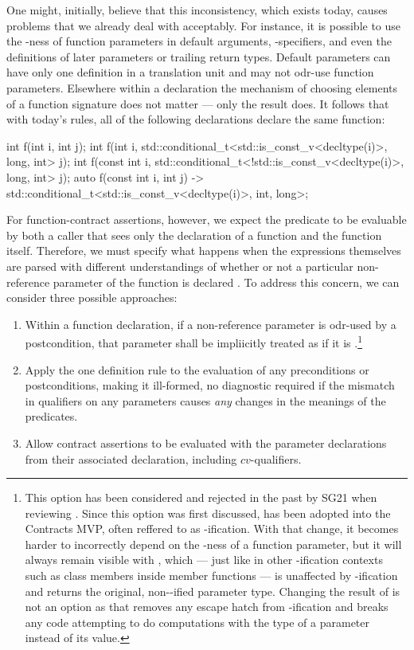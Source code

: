 One might, initially, believe that this inconsistency, which exists today, causes problems that we already deal with acceptably.  For instance, it is possible to use the -ness of function parameters in default arguments, -specifiers, and even the definitions of later parameters or trailing return types.   Default parameters can have only one definition in a translation unit and may not odr-use function parameters.  Elsewhere within a declaration the mechanism of choosing elements of a function signature does not matter --- only the result does. It follows that with today's rules, all of the following declarations declare the same function:
\begin{codeblock}
int f(int i, int j);
int f(int i, std::conditional_t<std::is_const_v<decltype(i)>, long, int> j);
int f(const int i, std::conditional_t<!std::is_const_v<decltype(i)>, long, int> j);
auto f(const int i, int j)
-> std::conditional_t<std::is_const_v<decltype(i)>, int, long>;
\end{codeblock}
For function-contract assertions, however, we expect the predicate to be evaluable by both a caller that sees only the declaration of a function and the function itself.  Therefore, we must specify what happens when the expressions themselves are parsed with different understandings of whether or not a particular non-reference parameter of the function is declared .  To address this concern, we can consider three possible approaches:
\renewcommand\labelenumi{V4\alph{enumi}.}
\renewcommand\theenumi\labelenumi
\begin{enumerate}
\item Within a function declaration, if a non-reference parameter is odr-used by a postcondition, that parameter shall be impliicitly treated as if it is .\footnote{This option has been considered and rejected in the past by SG21 when reviewing \cite{P2829R0}. Since this option was first discussed, \cite{P3071R1} has been adopted into the Contracts MVP, often reffered to as -ification.   With that change, it becomes harder to incorrectly depend on the -ness of a function parameter, but it will always remain visible with , which --- just like in other -ification contexts such as class members inside  member functions --- is unaffected by -ification and returns the original, non--ified parameter type.  Changing the result of  is not an option as that removes any escape hatch from -ification and breaks any code attempting to do computations with the type of a parameter instead of its value.}

\item Apply the one definition rule to the evaluation of any preconditions or postconditions, making it ill-formed, no diagnostic required if the mismatch in  qualifiers on any parameters causes \emph{any} changes in the meanings of the predicates.
\item Allow contract assertions to be evaluated with the parameter declarations from their associated declaration, including $cv$-qualifiers.
\end{enumerate}
       
